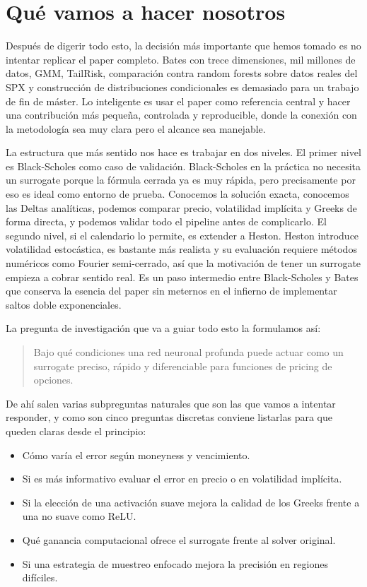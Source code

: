 \documentclass[11pt,a4paper]{article}
\begin{document}
\section*{Qué vamos a hacer nosotros}

Después de digerir todo esto, la decisión más importante que hemos tomado es no intentar replicar el paper completo. Bates con trece dimensiones, mil millones de datos, GMM, TailRisk, comparación contra random forests sobre datos reales del SPX y construcción de distribuciones condicionales es demasiado para un trabajo de fin de máster. Lo inteligente es usar el paper como referencia central y hacer una contribución más pequeña, controlada y reproducible, donde la conexión con la metodología sea muy clara pero el alcance sea manejable.

La estructura que más sentido nos hace es trabajar en dos niveles. El primer nivel es Black-Scholes como caso de validación. Black-Scholes en la práctica no necesita un surrogate porque la fórmula cerrada ya es muy rápida, pero precisamente por eso es ideal como entorno de prueba. Conocemos la solución exacta, conocemos las Deltas analíticas, podemos comparar precio, volatilidad implícita y Greeks de forma directa, y podemos validar todo el pipeline antes de complicarlo. El segundo nivel, si el calendario lo permite, es extender a Heston. Heston introduce volatilidad estocástica, es bastante más realista y su evaluación requiere métodos numéricos como Fourier semi-cerrado, así que la motivación de tener un surrogate empieza a cobrar sentido real. Es un paso intermedio entre Black-Scholes y Bates que conserva la esencia del paper sin meternos en el infierno de implementar saltos doble exponenciales.

La pregunta de investigación que va a guiar todo esto la formulamos así:

\begin{quote}
Bajo qué condiciones una red neuronal profunda puede actuar como un surrogate preciso, rápido y diferenciable para funciones de pricing de opciones.
\end{quote}

De ahí salen varias subpreguntas naturales que son las que vamos a intentar responder, y como son cinco preguntas discretas conviene listarlas para que queden claras desde el principio:

\begin{itemize}
\item Cómo varía el error según moneyness y vencimiento.
\item Si es más informativo evaluar el error en precio o en volatilidad implícita.
\item Si la elección de una activación suave mejora la calidad de los Greeks frente a una no suave como ReLU.
\item Qué ganancia computacional ofrece el surrogate frente al solver original.
\item Si una estrategia de muestreo enfocado mejora la precisión en regiones difíciles.
\end{itemize}
\end{document}

